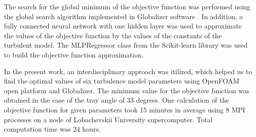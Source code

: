 \documentclass[sensors,article,submit,moreauthors,pdftex]{Definitions/mdpi}
\begin{document}
\begin{paracol}{2}
The search for the global minimum of the objective function was performed using the global search algorithm implemented in Globalizer software \cite{globalizerSystem}. In addition, a fully connected neural network with one hidden layer was used to approximate the values of the objective function by the values of the constants of the turbulent model. The MLPRegressor class from the Scikit-learn library was used to build the objective function approximation. 

In the present work, an interdisciplinary approach was itilized, which helped us to find the optimal values of six turbulence model parameters using OpenFOAM open platform and Globalizer. The minimum value for the objective function was obtained in the case of the tray angle of 33 degrees. One calculation of the objective function for given parameters took 15 minutes in average using 8 MPI processes on a node of Lobachevskii University supercomputer. Total computation time was 24 hours.  




%

\vspace{6pt} 





\end{paracol}
\end{document}
